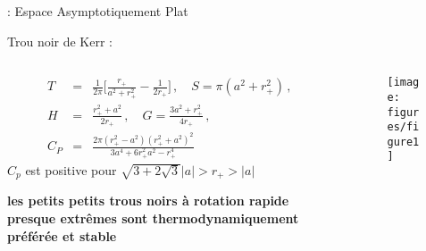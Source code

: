 \begin{frame}{\underline{\secname} : Espace Asymptotiquement Plat}
\begin{block}{Trou noir de Kerr :}
	
	\begin{columns}
		\begin{column}{0.6\linewidth}
\begin{eqnarray*}
T&=&\frac{1}{2\pi}\bigg[\frac{r_+}{a^2+r_+^2}-\frac{1}{2r_+}\bigg]\,,\quad 
S=\pi(a^2+r_+^2)\,,\nonumber\\
H&=&\frac{r_+^2+a^2}{2r_+}\,,\quad  G=\frac{3a^2+r_+^2}{4r_+} \,,\nonumber\\
C_P&=&\frac{2\pi(r_+^2-a^2)(r_+^2+a^2)^2}{3a^4+6r_+^2a^2-r_+^4}
\end{eqnarray*}
$C_p$ est positive pour $\sqrt{3+2\sqrt{3}}|a|>r_+>|a|$

\pause
\begin{center}
	\textbf{les petits petits trous noirs à rotation rapide presque extrêmes sont thermodynamiquement préférée et stable}
\end{center}
		\end{column}
		\begin{column}{0.4\linewidth}
			\begin{figure}[H]
				\begin{center}
					\texttt{[image: figures/figure1]}
				\end{center}
			\end{figure}
			
			
		\end{column}
	\end{columns}
\end{block}
\end{frame}







